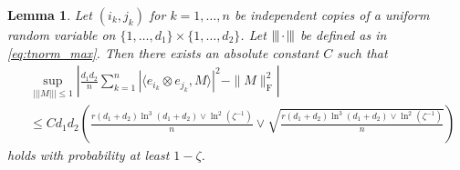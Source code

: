 \documentclass[11pt]{article}
\newtheorem{lemma}{Lemma}[section]
\newcommand{\xspace}{\hbox{\kern-2.5pt}}
\newcommand\tnorm[1]{\left\vert\xspace\left\vert\xspace\left\vert\mskip2mu
#1\mskip2mu \right\vert\xspace\right\vert\xspace\right\vert}
\begin{document}
\begin{lemma}
\label{lemma:rip_mc}
Let $(i_k,j_k)$ for $k=1,\dots,n$ be independent copies of a uniform random variable on $\{1,\dots,d_1\} \times \{1,\dots,d_2\}$. Let $\tnorm{\cdot}$ be defined as in \eqref{eq:tnorm_max}. 
Then there exists an absolute constant $C$ such that
\begin{equation}
\label{eq:lrf_rip}
\begin{aligned}
& \sup_{\vert\vert\vert M \vert\vert\vert \leq 1}
\left| \frac{d_1 d_2}{n} \sum_{k=1}^n |\langle e_{i_k} \otimes e_{j_k}, M \rangle|^2 - \|M\|_\mathrm{F}^2 \right| \\
& \leq
C d_1 d_2 \left( \frac{ r(d_1+d_2)\ln^3(d_1+d_2) \vee \ln^2(\zeta^{-1})}{n} \vee \sqrt{\frac{ r(d_1+d_2)\ln^3(d_1+d_2) \vee \ln^2(\zeta^{-1})}{n}} \right)
\end{aligned}
\end{equation}
holds with probability at least $1-\zeta$.
\end{lemma}
\end{document}
